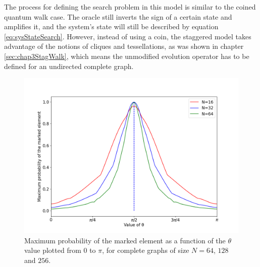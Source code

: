 \documentclass[../../dissertation.tex]{subfiles}
\begin{document}
The process for defining the search problem in this model is similar to the
coined quantum walk case. The oracle still inverts the sign of a certain state
and amplifies it, and the system's state will still be described by equation
\ref{eq:sysStateSearch}. However, instead of using a coin, the staggered model
takes advantage of the notions of cliques and tessellations, as was shown in
chapter \ref{sec:chap3StagWalk}, which means the unmodified evolution operator
has to be defined for an undirected complete graph.
\begin{figure}[!h]
	\centering
	\includegraphics[scale=0.40]{img/StagQuantumWalk/Search/Theta163264.png}
	\caption{Maximum probability of the marked element as a function of the $\theta$ value plotted from $0$ to $\pi$, for complete graphs of size $N=64$, $128$ and $256$.} 
	\label{fig:stagMultTheta}
\end{figure}\par
\end{document}
